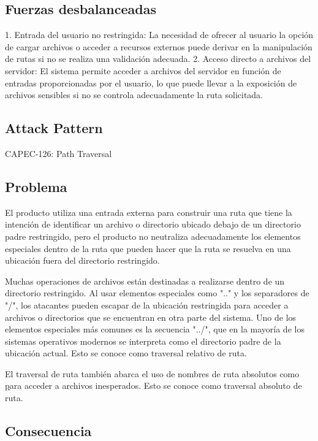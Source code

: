 \subsection*{Fuerzas desbalanceadas}

1. Entrada del usuario no restringida: La necesidad de ofrecer al usuario la opción de cargar archivos o acceder a recursos externos puede derivar en la manipulación de rutas si no se realiza una validación adecuada.
2. Acceso directo a archivos del servidor: El sistema permite acceder a archivos del servidor en función de entradas proporcionadas por el usuario, lo que puede llevar a la exposición de archivos sensibles si no se controla adecuadamente la ruta solicitada.

\subsection*{Attack Pattern}
CAPEC-126: Path Traversal

\subsection*{Problema}

El producto utiliza una entrada externa para construir una ruta que tiene la intención de identificar un archivo o directorio ubicado debajo de un directorio padre restringido, pero el producto no neutraliza adecuadamente los elementos especiales dentro de la ruta que pueden hacer que la ruta se resuelva en una ubicación fuera del directorio restringido.

Muchas operaciones de archivos están destinadas a realizarse dentro de un directorio restringido. Al usar elementos especiales como ".." y los separadores de "/", los atacantes pueden escapar de la ubicación restringida para acceder a archivos o directorios que se encuentran en otra parte del sistema. Uno de los elementos especiales más comunes es la secuencia "../", que en la mayoría de los sistemas operativos modernos se interpreta como el directorio padre de la ubicación actual. Esto se conoce como traversal relativo de ruta.

El traversal de ruta también abarca el uso de nombres de ruta absolutos como \href{usr/local/bin} para acceder a archivos inesperados. Esto se conoce como traversal absoluto de ruta. 

\subsection*{\textbf{Consecuencia}}

